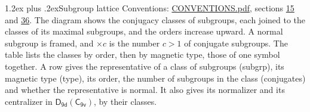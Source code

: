\documentclass[10pt,a4paper]{article}
\makeatletter
\renewcommand\section{\@startsection{section}{1}{\z@}{-3ex plus -1ex minus -.2ex}%
  {1.2ex plus .2ex}{\normalfont\large\sffamily\bfseries\color{parttitle}}}
\numberwithin{equation}{section}
\newcommand{\grp}[1]{\mathsf{#1}}
\makeatother
\begin{document}
\section{Subgroup lattice}\label{s:subgroups}
Conventions: \href{../../CONVENTIONS.pdf}{CONVENTIONS.pdf}, sections \href{../../../rotation/CONVENTIONS.pdf\#conv.15}{15} and \href{../../CONVENTIONS.pdf\#conv.36}{36}.
The diagram shows the conjugacy classes of subgroups, each joined to the classes of its maximal subgroups, and the orders increase upward. \label{n:index.conjugates.c}\label{n:mark.conjugates}A normal subgroup is framed, and ${\times}c$ is the number $c > 1$ of conjugate subgroups. The table lists the classes by order, then by magnetic type, those of one symbol together. \label{n:head.subgroup}\label{n:head.magnetic.type}\label{n:head.order}\label{n:head.conjugates}\label{n:head.normal}A row gives the representative of a class of subgroups (subgrp), its magnetic type (type), its order, the number of subgroups in the class (conjugates) and whether the representative is normal. \label{n:head.normalizer}\label{n:head.centralizer}It also gives its normalizer and its centralizer in $\grp{D_{9d}}(\grp{C_{9v}})$, by their classes. 
\end{document}
